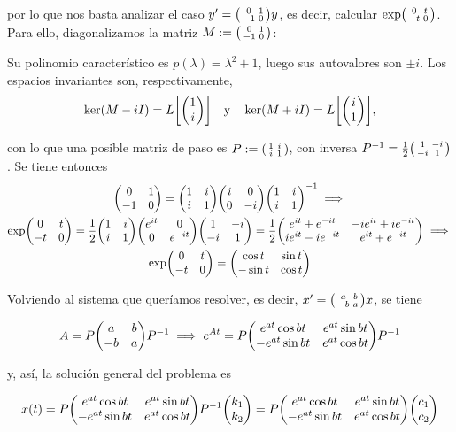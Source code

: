 \documentclass[../ecuaciones_diferenciales.tex]{subfiles}
\begin{document}
por lo que nos basta analizar el caso \(y' = \smat{0 & 1 \\ -1 & 0}y\), es
decir, calcular \(\exp \smat{0 & t \\ -t & 0}\). Para ello, diagonalizamos la
matriz \(M := \smat{0 & 1 \\ -1 & 0}\):

Su polinomio característico es \(p(\lambda) = \lambda^2 + 1\), luego sus
autovalores son \(\pm i\). Los espacios invariantes son, respectivamente,
\[\ker(M - iI) = L\left[\mat{1 \\ i}\right] \quad \text{y} \quad \ker(M + iI) =
	L\left[\mat{i \\ 1}\right],\]

con lo que una posible matriz de paso es \(P := \smat{1 & i \\ i & 1}\), con
inversa \(P^{-1} = \frac{1}{2} \smat{1 & -i \\ -i & 1}\). Se tiene entonces
\begin{gather*}
	\mat{0 & 1 \\ -1 & 0} = \mat{1 & i \\ i & 1} \mat{i & 0 \\ 0 & -i}
	\mat{1 & i \\ i & 1} ^{-1} \implies \\
	\exp \mat{0 & t \\ -t & 0} = \frac{1}{2} \mat{1 & i \\ i & 1}
	\mat{e^{it} & 0 \\ 0 & e^{-it}} \mat {1 & -i \\ -i & 1} =
	\frac{1}{2} \mat{e^{it}+e^{-it} & -ie^{it}+ie^{-it} \\ ie^{it}-ie^{-it} &
	e^{it}+e^{-it}} \implies \\
	\exp \mat{0 & t \\ -t & 0} = \mat{\cos t & \sin t \\ -\sin t & \cos t}
\end{gather*}

Volviendo al sistema que queríamos resolver, es decir, \(x' = \smat{a & b \\
	-b & a}x\), se tiene

\[A = P \mat{a & b \\ -b & a} P^{-1} \implies e^{At} = P \mat{e^{at}\cos bt &
	e^{at}\sin bt \\ -e^{at} \sin bt & e^{at} \cos bt} P^{-1}\]

y, así, la solución general del problema es

\[x(t) = P \mat{e^{at}\cos bt &
	e^{at}\sin bt \\ -e^{at} \sin bt & e^{at} \cos bt} P^{-1} \mat{k_1 \\
		k_2} = P \mat{e^{at}\cos bt & e^{at}\sin bt \\ -e^{at} \sin bt & e^{at}
	\cos bt} \mat {c_1 \\ c_2}\]
\end{document}

